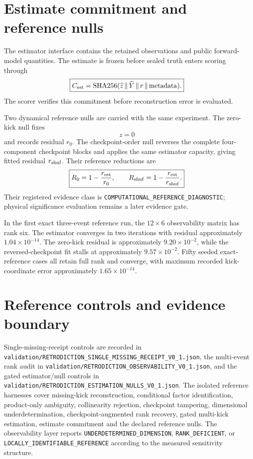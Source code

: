 \documentclass[11pt]{book}
\begin{document}
\section{Estimate commitment and reference nulls}

The estimator interface contains the retained observations and public forward-model quantities. The estimate is frozen before sealed truth enters scoring through
\[
\boxed{
C_{\rm est}
=\operatorname{SHA256}(\widehat z\,\|\,\widehat Y\,\|\,r\,\|\,\mathrm{metadata}).
}
\]
The scorer verifies this commitment before reconstruction error is evaluated.

Two dynamical reference nulls are carried with the same experiment. The zero-kick null fixes
\[
z=0
\]
and records residual \(r_0\). The checkpoint-order null reverses the complete four-component checkpoint blocks and applies the same estimator capacity, giving fitted residual \(r_{\rm shuf}\). Their reference reductions are
\[
\boxed{
R_0=1-\frac{r_{\rm est}}{r_0},
\qquad
R_{\rm shuf}=1-\frac{r_{\rm est}}{r_{\rm shuf}}.
}
\]
Their registered evidence class is \texttt{COMPUTATIONAL\_REFERENCE\_DIAGNOSTIC}; physical significance evaluation remains a later evidence gate.

In the first exact three-event reference run, the \(12\times6\) observability matrix has rank six. The estimator converges in two iterations with residual approximately \(1.04\times10^{-14}\). The zero-kick residual is approximately \(9.20\times10^{-2}\), while the reversed-checkpoint fit stalls at approximately \(9.57\times10^{-2}\). Fifty seeded exact-reference cases all retain full rank and converge, with maximum recorded kick-coordinate error approximately \(1.65\times10^{-14}\).

\section{Reference controls and evidence boundary}

Single-missing-receipt controls are recorded in
\texttt{validation/RETRODICTION\_SINGLE\_MISSING\_RECEIPT\_V0\_1.json},
the multi-event rank audit in
\texttt{validation/RETRODICTION\_OBSERVABILITY\_V0\_1.json},
and the gated estimator/null controls in
\texttt{validation/RETRODICTION\_ESTIMATION\_NULLS\_V0\_1.json}.
The isolated reference harnesses cover missing-kick reconstruction, conditional factor identification, product-only ambiguity, collinearity rejection, checkpoint tampering, dimensional underdetermination, checkpoint-augmented rank recovery, gated multi-kick estimation, estimate commitment and the declared reference nulls. The observability layer reports \texttt{UNDERDETERMINED\_DIMENSION}, \texttt{RANK\_DEFICIENT}, or \texttt{LOCALLY\_IDENTIFIABLE\_REFERENCE} according to the measured sensitivity structure.
\end{document}
